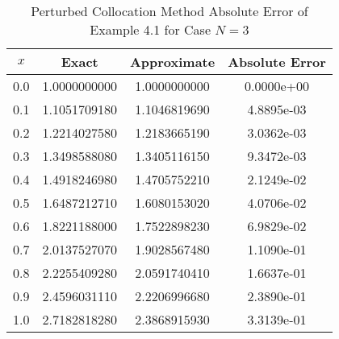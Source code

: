 \documentclass[12pt]{report}
\begin{document}
	\begin{table}[!hbt]
		\caption{Perturbed Collocation Method Absolute Error of Example 4.1 for Case $N=3$}
		\begin{center}
			\begin{tabular}{|c||c||c||c||}
				\hline
				$x$ & Exact & Approximate & Absolute Error\\ \hline
				0.0 & 1.0000000000 & 1.0000000000 & 0.0000e+00\\ \hline
				0.1 & 1.1051709180 & 1.1046819690 & 4.8895e-03\\ \hline
				0.2 & 1.2214027580 & 1.2183665190 & 3.0362e-03\\ \hline
				0.3 & 1.3498588080 & 1.3405116150 & 9.3472e-03\\ \hline
				0.4 & 1.4918246980 & 1.4705752210 & 2.1249e-02\\ \hline
				0.5 & 1.6487212710 & 1.6080153020 & 4.0706e-02\\ \hline
				0.6 & 1.8221188000 & 1.7522898230 & 6.9829e-02\\ \hline
				0.7 & 2.0137527070 & 1.9028567480 & 1.1090e-01\\ \hline
				0.8 & 2.2255409280 & 2.0591740410 & 1.6637e-01\\ \hline
				0.9 & 2.4596031110 & 2.2206996680 & 2.3890e-01\\ \hline
				1.0 & 2.7182818280 & 2.3868915930 & 3.3139e-01\\ \hline
			\end{tabular}
		\end{center}
		\label{tb:4_5}
	\end{table}	
	
\end{document}
